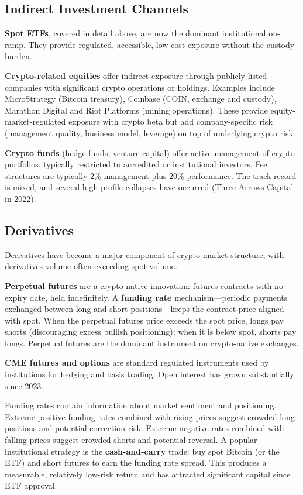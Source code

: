 \documentclass[11pt,a4paper]{article}
\newcommand{\keyword}[1]{\textbf{\textcolor{AccentOrange}{#1}}}
\begin{document}
\subsection{Indirect Investment Channels}

\textbf{Spot ETFs}, covered in detail above, are now the dominant institutional on-ramp. They provide regulated, accessible, low-cost exposure without the custody burden.

\textbf{Crypto-related equities} offer indirect exposure through publicly listed companies with significant crypto operations or holdings. Examples include MicroStrategy (Bitcoin treasury), Coinbase (COIN, exchange and custody), Marathon Digital and Riot Platforms (mining operations). These provide equity-market-regulated exposure with crypto beta but add company-specific risk (management quality, business model, leverage) on top of underlying crypto risk.

\textbf{Crypto funds} (hedge funds, venture capital) offer active management of crypto portfolios, typically restricted to accredited or institutional investors. Fee structures are typically 2\% management plus 20\% performance. The track record is mixed, and several high-profile collapses have occurred (Three Arrows Capital in 2022).

\subsection{Derivatives}

Derivatives have become a major component of crypto market structure, with derivatives volume often exceeding spot volume.

\keyword{Perpetual futures} are a crypto-native innovation: futures contracts with no expiry date, held indefinitely. A \keyword{funding rate} mechanism---periodic payments exchanged between long and short positions---keeps the contract price aligned with spot. When the perpetual futures price exceeds the spot price, longs pay shorts (discouraging excess bullish positioning); when it is below spot, shorts pay longs. Perpetual futures are the dominant instrument on crypto-native exchanges.

\keyword{CME futures and options} are standard regulated instruments used by institutions for hedging and basis trading. Open interest has grown substantially since 2023.

Funding rates contain information about market sentiment and positioning. Extreme positive funding rates combined with rising prices suggest crowded long positions and potential correction risk. Extreme negative rates combined with falling prices suggest crowded shorts and potential reversal. A popular institutional strategy is the \keyword{cash-and-carry} trade: buy spot Bitcoin (or the ETF) and short futures to earn the funding rate spread. This produces a measurable, relatively low-risk return and has attracted significant capital since ETF approval.
\end{document}
